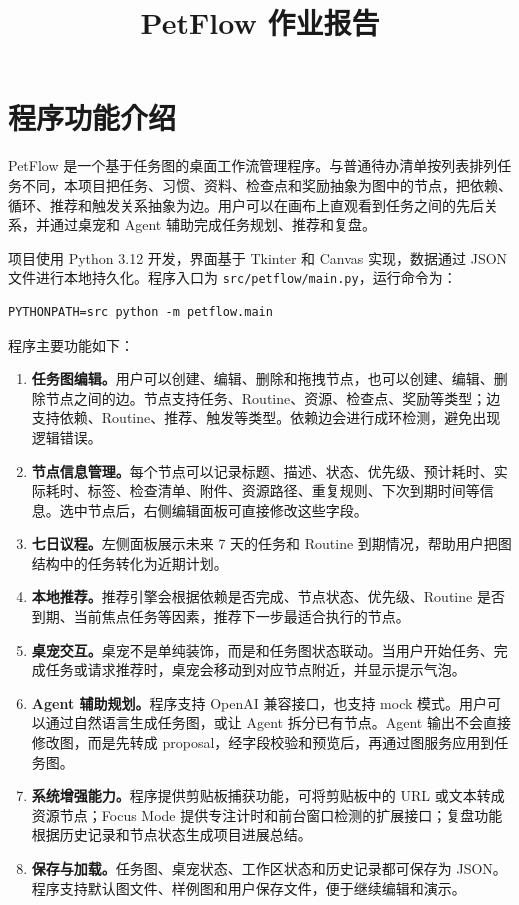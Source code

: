 \documentclass[UTF8,a4paper,12pt,fontset=none]{ctexart}
\title{\textbf{PetFlow 作业报告}}
\author{}
\date{}
\begin{document}
\maketitle

\section{程序功能介绍}

PetFlow 是一个基于任务图的桌面工作流管理程序。与普通待办清单按列表排列任务不同，本项目把任务、习惯、资料、检查点和奖励抽象为图中的节点，把依赖、循环、推荐和触发关系抽象为边。用户可以在画布上直观看到任务之间的先后关系，并通过桌宠和 Agent 辅助完成任务规划、推荐和复盘。

项目使用 Python 3.12 开发，界面基于 Tkinter 和 Canvas 实现，数据通过 JSON 文件进行本地持久化。程序入口为 \texttt{src/petflow/main.py}，运行命令为：

\begin{verbatim}
PYTHONPATH=src python -m petflow.main
\end{verbatim}

程序主要功能如下：

\begin{enumerate}
  \item \textbf{任务图编辑。}用户可以创建、编辑、删除和拖拽节点，也可以创建、编辑、删除节点之间的边。节点支持任务、Routine、资源、检查点、奖励等类型；边支持依赖、Routine、推荐、触发等类型。依赖边会进行成环检测，避免出现逻辑错误。

  \item \textbf{节点信息管理。}每个节点可以记录标题、描述、状态、优先级、预计耗时、实际耗时、标签、检查清单、附件、资源路径、重复规则、下次到期时间等信息。选中节点后，右侧编辑面板可直接修改这些字段。

  \item \textbf{七日议程。}左侧面板展示未来 7 天的任务和 Routine 到期情况，帮助用户把图结构中的任务转化为近期计划。

  \item \textbf{本地推荐。}推荐引擎会根据依赖是否完成、节点状态、优先级、Routine 是否到期、当前焦点任务等因素，推荐下一步最适合执行的节点。

  \item \textbf{桌宠交互。}桌宠不是单纯装饰，而是和任务图状态联动。当用户开始任务、完成任务或请求推荐时，桌宠会移动到对应节点附近，并显示提示气泡。

  \item \textbf{Agent 辅助规划。}程序支持 OpenAI 兼容接口，也支持 mock 模式。用户可以通过自然语言生成任务图，或让 Agent 拆分已有节点。Agent 输出不会直接修改图，而是先转成 proposal，经字段校验和预览后，再通过图服务应用到任务图。

  \item \textbf{系统增强能力。}程序提供剪贴板捕获功能，可将剪贴板中的 URL 或文本转成资源节点；Focus Mode 提供专注计时和前台窗口检测的扩展接口；复盘功能根据历史记录和节点状态生成项目进展总结。

  \item \textbf{保存与加载。}任务图、桌宠状态、工作区状态和历史记录都可保存为 JSON。程序支持默认图文件、样例图和用户保存文件，便于继续编辑和演示。
\end{enumerate}
\end{document}
